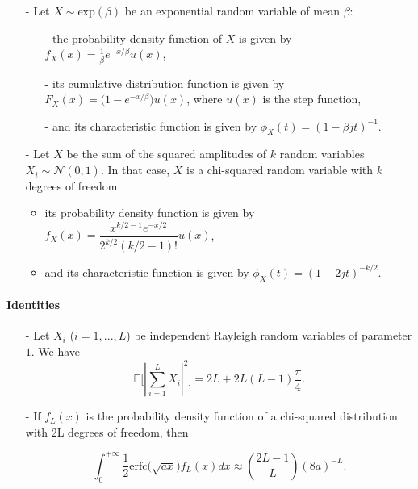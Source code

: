 \documentclass [a4paper, 11pt] {article}
\begin{document}
\begin{reminder}
\begin{itemize}
\item[-] Let $X \sim \text{exp}(\beta)$ be an exponential random variable of mean $\beta$:
    
    \begin{itemize} 
    \item[-] the probability density function of $X$ is given by $f_X(x) = \frac{1}{\beta}e^{-x/\beta}u(x)$,
    \item[-] its cumulative distribution function is given by $F_X(x) = \big(1 - e^{-x/\beta}\big)u(x)$, where $u(x)$ is the step function, 
    \item[-] and its characteristic function is given by $\phi_X(t) = (1-\beta jt)^{-1}$.
    \end{itemize}

\item[-] Let $X$ be the sum of the squared amplitudes of $k$ random variables $X_i \sim \mathcal{N}(0,1)$. In that case, $X$ is a chi-squared random variable with $k$ degrees of freedom:

    \begin{itemize}
        \item its probability density function is given by $f_X(x) = \dfrac{x^{k/2-1}e^{-x/2}}{2^{k/2}(k/2-1)!} u(x)$,
        \item and its characteristic function is given by $\phi_X(t) = (1-2jt)^{-k/2}$.
    \end{itemize}
\end{itemize}


\paragraph{Identities}

\begin{itemize}
\item[-] Let $X_i$ ($i=1,...,L$) be independent Rayleigh random variables of parameter $1$. We have 
    \begin{equation}
    \mathbb{E}\Big[ |\sum_{i=1}^{L} X_i|^2 \Big] = 2L + 2L(L-1)\frac{\pi}{4}.
    \end{equation}
    
\item[-] If $f_L(x)$ is the probability density function of a chi-squared distribution with 2L degrees of freedom, then
    
    \begin{equation}
    \int_{0}^{+\infty}\frac{1}{2}\text{erfc}\big(\sqrt{ax}\big)f_L(x)dx \approx \binom{2L-1}{L} (8a)^{-L}.
    \end{equation}

\end{itemize}
    
    \end{reminder}
    
\end{document}
